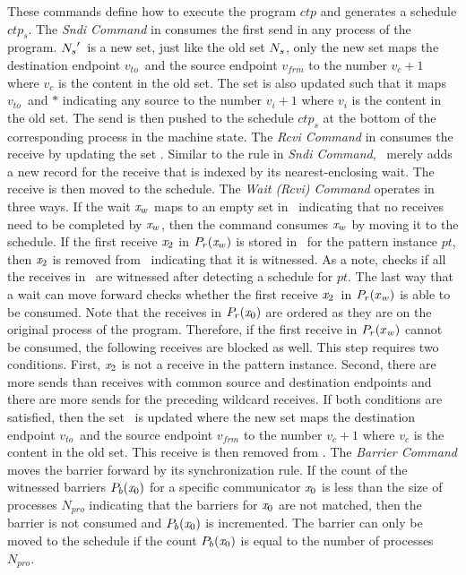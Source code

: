 These commands define how to execute the program $\mathit{ctp}$ and generates a schedule $\mathit{ctp}_s$. The \emph{Sndi Command} in  consumes the first send in any process of the program. 
$\textit{$N_s$}^\prime$\ is a new set, just like the old set $\textit{$N_s$}$, only the new set maps the destination
endpoint $v_{to}$\ and the source endpoint $v_{frm}$ to the number $v_c + 1$ where $v_c$ is the content in the old set. The set is also updated such that it maps $v_{to}$\ and $\ast$ indicating any source to the number $v_i + 1$ where $v_i$ is the content in the old set. The send is then pushed to the schedule $\mathit{ctp}_s$ at the bottom of the corresponding process in the machine state. The \emph{Rcvi Command} in  consumes the receive by updating the set \epwait. Similar to the rule in \emph{Sndi Command}, \epwait\ merely adds a new record for the receive that is indexed by its nearest-enclosing wait. The receive is then moved to the schedule. The \emph{Wait (Rcvi) Command} operates in three ways. If the wait $\mathit{x}_w$ maps to an empty set in \epwait\ indicating that no receives need to be completed by $\mathit{x}_w$, then the command consumes $\mathit{x}_w$ by moving it to the schedule. If the first receive $\mathit{x}_2$ in $\textit{$P_r$}(\mathit{x}_w)$ is stored in \rcvp\ for the pattern instance $\mathit{pt}$, then $\mathit{x}_2$ is removed from \rcvp\ indicating that it is witnessed. As a note,  checks if all the receives in \rcvp\ are witnessed after detecting a schedule for $\mathit{pt}$. The last way that a wait can move forward checks whether the first receive $\mathit{x}_2$\ in $\textit{$P_r$}(x_w)$ is able to be consumed. Note that the receives in $\textit{$P_r$}(\mathit{x}_0)$ are ordered as they are on the original process of the program. Therefore, if the first receive in $\textit{$P_r$}(x_w)$ cannot be consumed, the following receives are blocked as well. This step requires two conditions. First, $\mathit{x}_2$ is not a receive in the pattern instance. Second, there are more sends than receives with common source and destination endpoints and there are more sends for the preceding wildcard receives. If both conditions are satisfied, then the set \eprcv\ is updated where the new set maps the destination endpoint $v_{to}$\ and the source endpoint $v_{frm}$ to the number $v_c + 1$ where $v_c$ is the content in the old set. This receive is then removed from \epwait. The \emph{Barrier Command} moves the barrier forward by its synchronization rule. If the count of the witnessed barriers $\textit{$P_b$}(\mathit{x}_0)$ for a specific communicator $\mathit{x}_0$ is less than the size of processes $N_{pro}$ indicating that the barriers for $\mathit{x}_0$ are not matched, then the barrier is not consumed and $\textit{$P_b$}(\mathit{x}_0)$ is incremented. The barrier can only be moved to the schedule if the count $\textit{$P_b$}(\mathit{x}_0)$ is equal to the number of processes $N_{pro}$.

